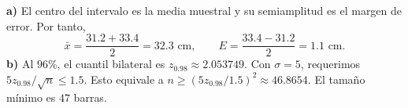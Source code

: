 \textbf{a)} El centro del intervalo es la media muestral
y su semiamplitud es el margen de error. Por tanto,
\[
\bar x=\frac{31.2+33.4}{2}=\boxed{32.3\text{ cm}},\qquad
E=\frac{33.4-31.2}{2}=\boxed{1.1\text{ cm}}.
\]
\textbf{b)} Al $96\%$, el cuantil bilateral es
$z_{0.98}\approx2.053749$. Con $\sigma=5$, requerimos
$5z_{0.98}/\sqrt n\le1.5$. Esto equivale a
$n\ge(5z_{0.98}/1.5)^2\approx46.8654$.
El tamaño mínimo es $\boxed{47}$ barras.
